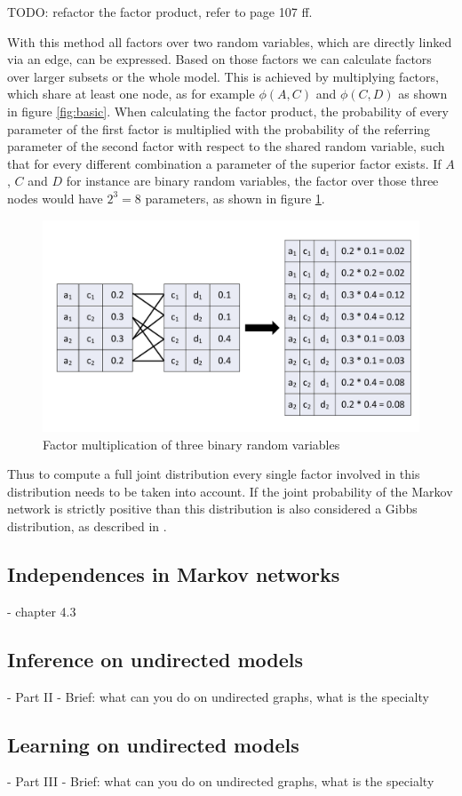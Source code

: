 TODO: refactor the factor product, refer to \cite{koller2009probabilistic} page 107 ff.

With this method all factors over two random variables, which are directly linked via an edge, can be expressed. Based on those factors we can calculate factors over larger subsets or the whole model. This is achieved by multiplying factors, which share at least one node, as for example $\phi(A,C)$ and $\phi(C,D)$ as shown in figure \ref{fig:basic}. When calculating the factor product, the probability of every parameter of the first factor is multiplied with the probability of the referring parameter of the second factor with respect to the shared random variable, such that for every different combination a parameter of the superior factor exists. If $A$, $C$ and $D$ for instance are binary random variables, the factor over those three nodes would have $2^3=8$ parameters, as shown in figure \ref{fig:parammult}.

\begin{figure}[htpb]
  \centering
  	\includegraphics[scale=0.4]{img/parammult.pdf} 
  \caption{Factor multiplication of three binary random variables}
  \label{fig:parammult}
\end{figure}

Thus to compute a full joint distribution every single factor involved in this distribution needs to be taken into account. If the joint probability of the Markov network is strictly positive than this distribution is also considered a Gibbs distribution, as described in \cite{kindermann1980markov}.

\subsection{Independences in Markov networks}

- chapter 4.3

\subsection{Inference on undirected models}

- Part II
- Brief: what can you do on undirected graphs, what is the specialty

\subsection{Learning on undirected models}

- Part III
- Brief: what can you do on undirected graphs, what is the specialty
